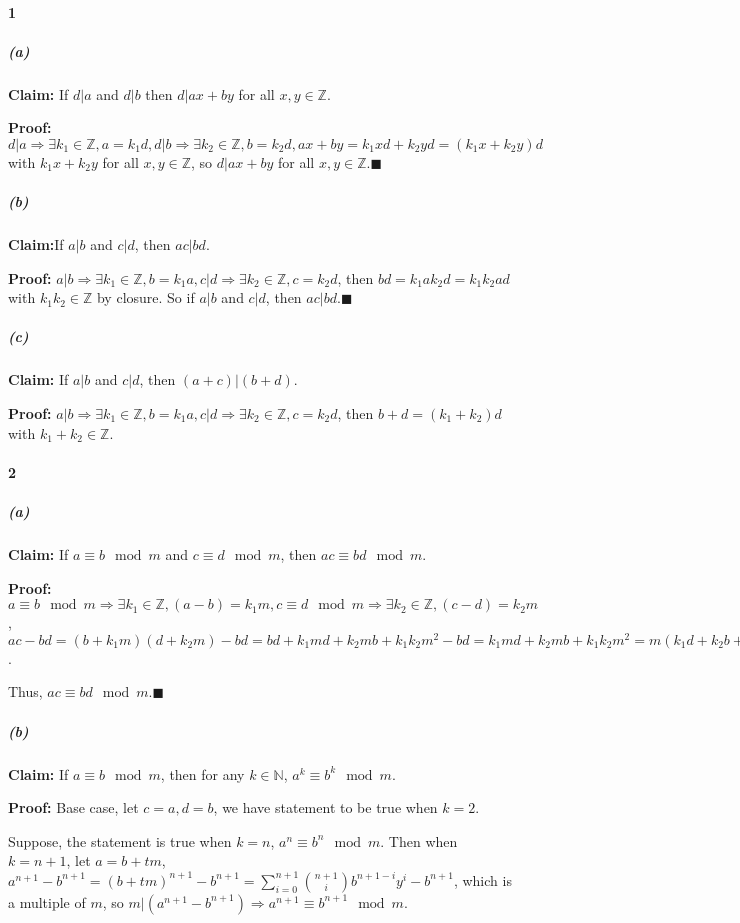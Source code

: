 \documentclass[11pt]{article}
\begin{document}
	\paragraph{1}
		\subparagraph{(a)}
			\textbf{Claim:} If $d | a$ and $d | b$ then $d | ax + by$ for all $x, y \in \mathbb{Z}$.
			
			\textbf{Proof:} $d | a \Rightarrow \exists k_1 \in \mathbb{Z}, a = k_1d, d | b \Rightarrow \exists k_2 \in \mathbb{Z}, b = k_2d, ax + by = k_1xd + k_2yd = (k_1x+ k_2y)d$ with $k_1x+ k_2y$ for all $x, y \in \mathbb{Z}$, so $d | ax + by$ for all $x, y \in \mathbb{Z}$.$\blacksquare$ 
		\subparagraph{(b)}
			\textbf{Claim:}If $a | b$ and $c | d$, then $ac | bd$.
			
			\textbf{Proof:} $a | b \Rightarrow \exists k_1 \in \mathbb{Z}, b = k_1a, c | d \Rightarrow \exists k_2 \in \mathbb{Z}, c = k_2d$, then $bd = k_1ak_2d = k_1k_2ad$ with $k_1k_2 \in \mathbb{Z}$ by closure. So if $a | b$ and $c | d$, then $ac | bd$.$\blacksquare$
		\subparagraph{(c)}
			\textbf{Claim:} If $a | b$ and $c | d$, then $(a + c) | (b + d)$.
				
			\textbf{Proof:} $a | b \Rightarrow \exists k_1 \in \mathbb{Z}, b = k_1a, c | d \Rightarrow \exists k_2 \in \mathbb{Z}, c = k_2d$, then $b + d = (k_1 + k_2)d$ with $k_1 + k_2 \in \mathbb{Z}$.
	\paragraph{2}
		\subparagraph{(a)}
			\textbf{Claim:} If $a \equiv b \mod m$ and $c \equiv d \mod m$, then $ac \equiv bd \mod m$.
			
			\textbf{Proof:} $a \equiv b \mod m \Rightarrow \exists k_1 \in \mathbb{Z}, (a - b) = k_1m, c \equiv d \mod m \Rightarrow \exists k_2 \in \mathbb{Z}, (c - d) = k_2m$, $ac - bd = (b + k_1m)(d + k_2m) - bd = bd + k_1md + k_2mb + k_1k_2m^2 - bd = k_1md + k_2mb + k_1k_2m^2 = m(k_1d + k_2b + k_1k_2m)$.
			
			Thus, $ac \equiv bd \mod m.\blacksquare$
		\subparagraph{(b)}
			\textbf{Claim:} If $a \equiv b \mod m$, then for any $k \in \mathbb{N}$, $a^k \equiv b^k \mod m$.
			
			\textbf{Proof:} Base case, let $c = a, d = b$, we have statement to be true when $k = 2$.
			
			Suppose, the statement is true when $k = n$, $a^n \equiv b^n \mod m$. Then when $k = n + 1$, let $a = b + tm$, $a^{n + 1} - b^{n + 1} = (b + tm)^{n + 1} - b^{n + 1} = \sum_{i = 0}^{n + 1}\binom{n + 1}{i} b^{n + 1 - i}y^i - b^{n + 1}$, which is a multiple of $m$, so $m | (a^{n + 1} - b^{n + 1}) \Rightarrow a^{n + 1} \equiv b^{n + 1} \mod m$.
			
\end{document}
